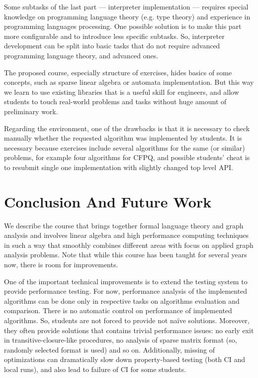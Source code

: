\documentclass[sigconf]{acmart}
\begin{document}
Some subtasks of the last part --- interpreter implementation --- requires special knowledge on programming language theory (e.g. type theory) and experience in programming languages processing.
One possible solution is to make this part more configurable and to introduce less specific subtasks.
So, interpreter development can be split into basic tasks that do not require advanced programming language theory, and advanced ones.


The proposed course, especially structure of exercises, hides basics of some concepts, such as sparse linear algebra or automata implementation.
But this way we learn to use existing libraries that is a useful skill for engineers, and allow students to touch real-world problems and tasks without huge amount of preliminary work.

Regarding the environment, one of the drawbacks is that it is necessary to check manually whether the requested algorithm was implemented by students.
It is necessary because exercises include several algorithms for the same (or similar) problems, for example four algorithms for CFPQ, and possible students' cheat is to resubmit single one implementation with slightly changed top level API.


\section{Conclusion And Future Work}

We describe the course that brings together formal language theory and graph analysis and involves linear algebra and high performance computing techniques in such a way that smoothly combines different areas with focus on applied graph analysis problems. 
Note that while this course has been taught for several years now, there is room for improvements.

One of the important technical improvements is to extend the testing system to provide performance testing. 
For now, performance analysis of the implemented algorithms can be done only in respective tasks on algorithms evaluation and comparison.
There is no automatic control on performance of implemented algorithms. 
So, students are not forced to provide not na\"ive solutions.
Moreover, they often provide solutions that contains trivial performance issues: no early exit in transitive-closure-like procedures, no analysis of sparse matrix format (so, randomly selected format is used) and so on.
Additionally, missing of optimizations can dramatically slow down property-based testing (both CI and local runs), and also lead to failure of CI for some students.
\end{document}
